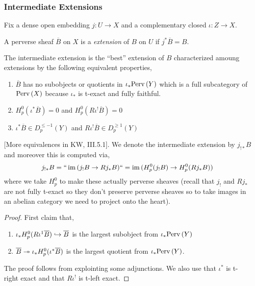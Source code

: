 \documentclass[12pt]{article}
\begin{document}
\subsubsection{Intermediate Extensions}

Fix a dense open embedding $j : U \to X$ and a complementary closed $\iota : Z \to X$.

\begin{defn}
A perverse sheaf $\overline{B}$ on $X$ is a \textit{extension} of $B$ on $U$ if $j^* \overline{B} = B$. 
\end{defn}

\begin{rmk}
The intermediate extension is the ``best'' extension of $B$ characterized amoung extensions by the following equivalent properties,
\begin{enumerate}
\item $\overline{B}$ has no subobjects or quotients in $\iota_* \mathrm{Perv}\left( Y \right)$ which is a full subcategory of $\mathrm{Perv}\left( X \right)$ because $\iota_*$ is t-exact and fully faithful.
\item $H^0_p(\iota^* \overline{B}) = 0$ and $H_p^0(R \iota^! \overline{B}) = 0$
\item $\iota^* \overline{B} \in D_p^{\le -1}(Y)$ and $R \iota^! \overline{B} \in D_p^{\ge 1}(Y)$
\end{enumerate}
[More equivalences in KW, III.5.1]. We denote the intermediate extension by $j_{!*} B$ and moreover this is computed via,
\[ j_{!*} B = ``\operatorname{\mathrm{im}}{(j_! B \to R j_* B)}`` = \operatorname{\mathrm{im}}{(H_p^0(j_! B) \to H_p^0(R j_* B))} \]
where we take $H_p^0$ to make these actually perverse sheaves (recall that $j_!$ and $R j_*$ are not fully t-exact so they don't preserve perverse sheaves so to take images in an abelian category we need to project onto the heart).
\end{rmk}

\begin{proof}
First claim that,
\begin{enumerate}
\item $\iota_* H_p^0(R \iota^1 \overline{B}) \hookrightarrow \overline{B}$ is the largest subobject from $\iota_* \mathrm{Perv}\left( Y \right)$
\item $\overline{B} \twoheadrightarrow \iota_* H^0_p(\iota^* \overline{B})$ is the largest quotient from $\iota_* \mathrm{Perv}\left( Y \right)$. 
\end{enumerate}
The proof follows from explointing some adjunctions. We also use that $\iota^*$ is t-right exact and that $R \iota^!$ is t-left exact.
\end{proof}
\end{document}
